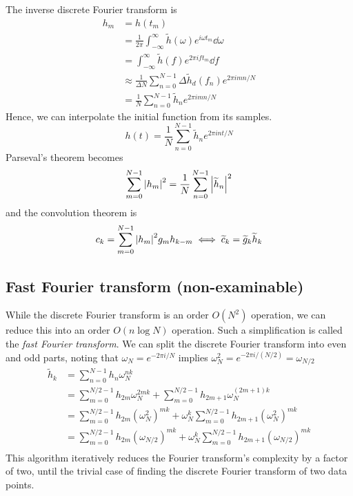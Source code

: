 The inverse discrete Fourier transform is
\begin{align*}
	h_m & = h(t_m)                                                                                  \\
	    & = \frac{1}{2\pi} \int_{-\infty}^\infty \widetilde h(\omega) e^{i \omega t_m} \dd{\omega}  \\
	    & = \int_{-\infty}^\infty \widetilde h(f) e^{2\pi i f t_m} \dd{f}                           \\
	    & \approx \frac{1}{\Delta N} \sum_{n=0}^{N-1} \Delta \widetilde h_d(f_n) e^{2\pi i m n / N} \\
	    & = \frac{1}{N} \sum_{n=0}^{N-1} \widetilde h_n e^{2\pi i m n / N}
\end{align*}
Hence, we can interpolate the initial function from its samples.
\[
	h(t) = \frac{1}{N} \sum_{n=0}^{N-1} \widetilde h_n e^{2\pi i n t / N}
\]
Parseval's theorem becomes
\[
	\sum_{m=0}^{N-1} \abs{h_m}^2 = \frac{1}{N} \sum_{n=0}^{N-1} \abs{\widetilde h_n}^2
\]
and the convolution theorem is
\[
	c_k = \sum_{m=0}^{N-1} \abs{h_m}^2 g_m h_{k-m} \iff \widetilde c_k = \widetilde g_k \widetilde h_k
\]

\subsection{Fast Fourier transform (non-examinable)}
While the discrete Fourier transform is an order \( O(N^2) \) operation, we can reduce this into an order \( O(n \log N) \) operation.
Such a simplification is called the \textit{fast Fourier transform}.
We can split the discrete Fourier transform into even and odd parts, noting that \( \omega_N = e^{-2\pi i / N} \) implies \( \omega_N^2 = e^{-2 \pi i / (N/2)} = \omega_{N/2} \)
\begin{align*}
	\widetilde h_k & = \sum_{n=0}^{N-1} h_n \omega_N^{nk}                                                                           \\
	               & = \sum_{m=0}^{N/2-1} h_{2m} \omega_N^{2mk} + \sum_{m=0}^{N/2-1} h_{2m + 1} \omega_N^{(2m+1)k}                  \\
	               & = \sum_{m=0}^{N/2-1} h_{2m} (\omega_N^2)^{mk} + \omega_N^k \sum_{m=0}^{N/2-1} h_{2m + 1} (\omega_N^2)^{mk}     \\
	               & = \sum_{m=0}^{N/2-1} h_{2m} (\omega_{N/2})^{mk} + \omega_N^k \sum_{m=0}^{N/2-1} h_{2m + 1} (\omega_{N/2})^{mk} \\
\end{align*}
This algorithm iteratively reduces the Fourier transform's complexity by a factor of two, until the trivial case of finding the discrete Fourier transform of two data points.

